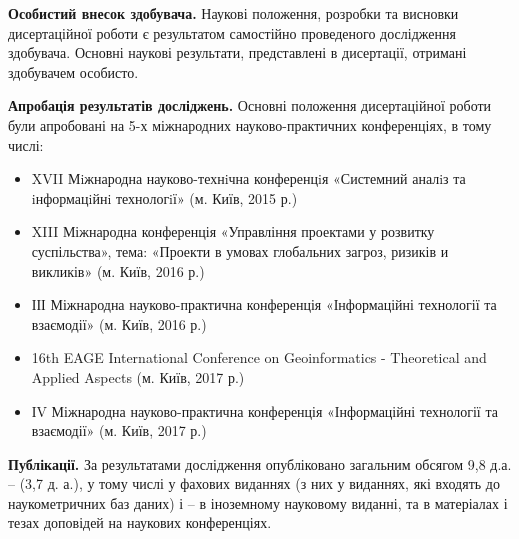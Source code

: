 \textbf{Особистий внесок здобувача.} Наукові положення, розробки та висновки дисертаційної роботи є результатом самостійно проведеного дослідження здобувача. Основні наукові результати, представлені в дисертації, отримані здобувачем особисто.

\textbf{Апробація результатів досліджень.} Основні положення дисертаційної роботи були апробовані на 5-х міжнародних науково-практичних конференціях, в тому числі:

\begin{itemize}
	\item XVII Мiжнародна науково-технiчна конференцiя «Системний аналiз та iнформацiйнi технологiї» (м. Київ, 2015 р.)
	\item XIII Міжнародна конференція «Управління проектами у розвитку суспільства», тема: «Проекти в умовах глобальних загроз, ризиків и викликів» (м. Київ, 2016 р.)
	\item ІІІ Міжнародна науково-практична конференція «Інформаційні технології та взаємодії» (м. Київ, 2016 р.)
	\item 16th EAGE International Conference on Geoinformatics - Theoretical and Applied Aspects (м. Київ, 2017 р.)
	\item ІV Міжнародна науково-практична конференція «Інформаційні технології та взаємодії» (м. Київ, 2017 р.)
\end{itemize}


\printbibliography[heading=countauthor, env=countauthor, keyword=biblioauthor, section=1]%
\printbibliography[heading=countauthorpaper, env=countauthorpaper, keyword=biblioauthor, notkeyword=biblioauthorconf, section=1]%
\printbibliography[heading=countauthorvak, env=countauthorvak, keyword=biblioauthorvak, section=1]%
\printbibliography[heading=countauthorindexed, env=countauthorindexed, keyword=biblioauthorvak, category=biblioauthoreng, section=1]%
\printbibliography[heading=countauthorconf, env=countauthorconf, keyword=biblioauthorconf, section=1]%
\printbibliography[heading=countauthornotvak, env=countauthornotvak, keyword=biblioauthornotvak, section=1]%
\printbibliography[heading=countauthoreng, env=countauthoreng, notkeyword=biblioauthorvak, category=biblioauthoreng, section=1]%

\textbf{Публікації.} 
За результатами дослідження опубліковано 
 загальним обсягом 9,8 д.а. – 
 (3,7 д. а.), у тому числі 
 у фахових виданнях (з них 
 у виданнях, які входять до наукометричних баз даних) і 
 – в іноземному науковому виданні, та 
 в матеріалах і тезах доповідей на наукових конференціях.



